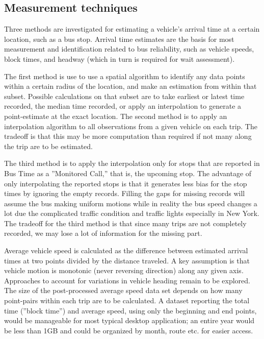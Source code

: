 \documentclass[12pt]{report}
\begin{document}
\subsection{Measurement techniques}


Three methods are investigated for estimating a vehicle's arrival time at a certain location, such as a bus stop.  Arrival time estimates are the basis for most measurement and identification related to bus reliability, such as vehicle speeds, block times, and headway (which in turn is required for wait assessment). 
 
The first method is use to use a spatial algorithm to identify any data points within a certain radius of the location, and make an estimation from within that subset.  Possible calculations on that subset are to take earliest or latest time recorded, the median time recorded, or apply an interpolation to generate a point-estimate at the exact location.  The second method is to apply an interpolation algorithm to all observations from a given vehicle on each trip.  The tradeoff is that this may be more computation than required if not many along the trip are to be estimated. 
 
The third method is to apply the interpolation only for stops that are reported in Bus Time as a ''Monitored Call,'' that is, the upcoming stop. The advantage of only interpolating the reported stops is that it generates less bias for the stop times by ignoring the empty records. Filling the gaps for missing records will assume the bus making uniform motions while in reality the bus speed changes a lot due the complicated traffic condition and traffic lights especially in New York. The tradeoff for the third method is that since many trips are not completely recorded, we may lose a lot of information for the missing part.

Average vehicle speed is calculated as the difference between estimated arrival times at two points divided by the distance traveled.  A key assumption is that vehicle motion is monotonic (never reversing direction) along any given axis.  Approaches to account for variations in vehicle heading remain to be explored.  The size of the post-processed average speed data set depends on how many point-pairs within each trip are to be calculated.  A dataset reporting the total time (''block time'') and average speed, using only the beginning and end points, would be manageable for most typical desktop application; an entire year would be less than 1GB and could be organized by month, route etc. for easier access.
\end{document}
